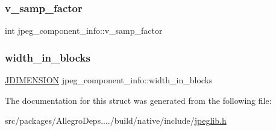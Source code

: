 \mbox{\label{structjpeg__component__info_a83b263da2a749a8fe96be728889af0df}} 
\subsubsection{\texorpdfstring{v\+\_\+samp\+\_\+factor}{v\_samp\_factor}}
{\footnotesize\ttfamily int jpeg\+\_\+component\+\_\+info\+::v\+\_\+samp\+\_\+factor}

\mbox{\label{structjpeg__component__info_a059454e8192effeabc6eab34e2ad198d}} 
\subsubsection{\texorpdfstring{width\+\_\+in\+\_\+blocks}{width\_in\_blocks}}
{\footnotesize\ttfamily \hyperlink{jmorecfg_8h_a04ed4674f6f1d0d50ec241531e38274f}{J\+D\+I\+M\+E\+N\+S\+I\+ON} jpeg\+\_\+component\+\_\+info\+::width\+\_\+in\+\_\+blocks}



The documentation for this struct was generated from the following file\+:\begin{DoxyCompactItemize}
\item 
src/packages/\+Allegro\+Deps..../build/native/include/\hyperlink{jpeglib_8h}{jpeglib.\+h}\end{DoxyCompactItemize}
